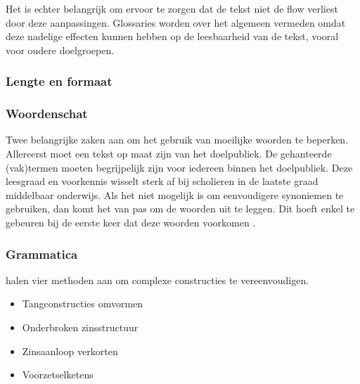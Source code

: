 Het is echter belangrijk om ervoor te zorgen dat de tekst niet de flow verliest door deze aanpassingen. Glossaries worden over het algemeen vermeden omdat deze nadelige effecten kunnen hebben op de leesbaarheid van de tekst, vooral voor oudere doelgroepen.


\subsubsection{Lengte en formaat}

% 


\subsubsection{Woordenschat}

Twee belangrijke zaken aan om het gebruik van moeilijke woorden te beperken. Allereerst moet een tekst op maat zijn van het doelpubliek. De gehanteerde (vak)termen moeten begrijpelijk zijn voor iedereen binnen het doelpubliek. Deze leesgraad en voorkennis wisselt sterk af bij scholieren in de laatste graad middelbaar onderwijs. Als het niet mogelijk is om eenvoudigere synoniemen te gebruiken, dan komt het van pas om de woorden uit te leggen. Dit hoeft enkel te gebeuren bij de eerste keer dat deze woorden voorkomen \autocite{Bosmans2022a, Bosmans2022b}.


\subsubsection{Grammatica}

\textcite{Bosmans2022c} halen vier methoden aan om complexe constructies te vereenvoudigen.

\begin{itemize}
	\item Tangconstructies omvormen %
	\item Onderbroken zinsstructuur %
	\item Zinsaanloop verkorten %
	\item Voorzetselketens %
\end{itemize}


